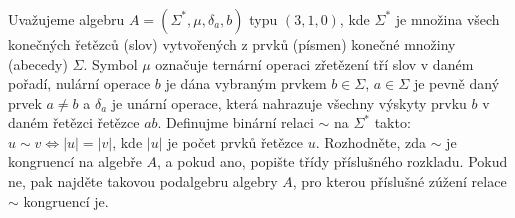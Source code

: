 \subsubsection{}
Uvažujeme algebru $A=\left ( \Sigma ^{*},\mu , \delta_{a},b \right )$ typu
$(3,1,0)$, kde $\Sigma^{*}$ je množina všech konečných řetězců (slov)
vytvořených z prvků (písmen) konečné množiny (abecedy) $\Sigma$. Symbol $\mu$
označuje ternární operaci zřetězení tří slov v daném pořadí, nulární operace $b$
je dána vybraným prvkem $b \in \Sigma$, $a \in \Sigma$ je pevně daný prvek $a
\neq b$ a $\delta_{a}$ je unární operace, která nahrazuje všechny výskyty prvku
$b$ v daném řetězci řetězce $ab$. Definujme binární relaci $\sim$ na
$\Sigma^{*}$ takto: $u \sim v \Leftrightarrow \left | u \right |=\left | v
\right |$, kde $\left | u \right |$ je počet prvků řetězce $u$. Rozhodněte, zda
$\sim$ je kongruencí na algebře $A$, a pokud ano, popište třídy příslušného
rozkladu. Pokud ne, pak najděte takovou podalgebru algebry $A$, pro kterou
příslušné zúžení  relace $\sim$ kongruencí je.
